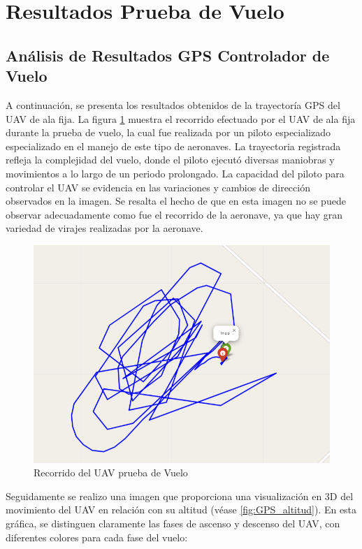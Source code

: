 \section{Resultados Prueba de Vuelo}
\subsection{Análisis de Resultados GPS Controlador de Vuelo}

A continuación, se presenta los resultados obtenidos de la trayectoría GPS del UAV de ala fija. La figura \ref{fig:GPS_pruebaVuelo} muestra el recorrido efectuado por el UAV de ala fija durante la prueba de vuelo, la cual fue realizada por un piloto especializado especializado en el manejo de este tipo de aeronaves. La trayectoria registrada refleja la complejidad del vuelo, donde el piloto ejecutó diversas maniobras y movimientos a lo largo de un periodo prolongado. La capacidad del piloto para controlar el UAV se evidencia en las variaciones y cambios de dirección observados en la imagen. Se resalta el hecho de que en esta imagen no se puede observar adecuadamente como fue el recorrido de la aeronave, ya que hay gran variedad de virajes realizadas por la aeronave. 
\begin{figure}[H]
    \centering
    \includegraphics[width=12 cm]{Imagenes/Vuelo/gps_Prueba.png}
    \caption{Recorrido del UAV prueba de Vuelo}
    \label{fig:GPS_pruebaVuelo}
\end{figure}

Seguidamente se realizo una imagen que proporciona una visualización en 3D del movimiento del UAV en relación con su altitud (véase \ref{fig:GPS_altitud}). En esta gráfica, se distinguen claramente las fases de ascenso y descenso del UAV, con diferentes colores para cada fase del vuelo: \\

